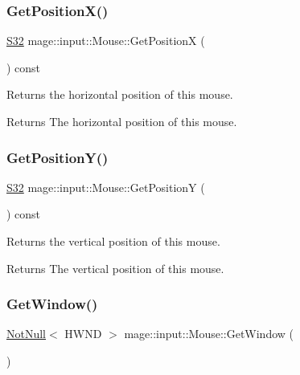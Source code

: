 \subsubsection{\texorpdfstring{Get\+Position\+X()}{GetPositionX()}}
{\footnotesize\ttfamily \mbox{\hyperlink{namespacemage_a2ef1a005a77358f1825d13fd481b557f}{S32}} mage\+::input\+::\+Mouse\+::\+Get\+PositionX (\begin{DoxyParamCaption}{ }\end{DoxyParamCaption}) const\hspace{0.3cm}{\ttfamily [noexcept]}}

Returns the horizontal position of this mouse.

\begin{DoxyReturn}{Returns}
The horizontal position of this mouse. 
\end{DoxyReturn}
\mbox{\label{classmage_1_1input_1_1_mouse_a81bf0ebd5fb34a25ba9f5d4c7aea1ed6}} 
\subsubsection{\texorpdfstring{Get\+Position\+Y()}{GetPositionY()}}
{\footnotesize\ttfamily \mbox{\hyperlink{namespacemage_a2ef1a005a77358f1825d13fd481b557f}{S32}} mage\+::input\+::\+Mouse\+::\+Get\+PositionY (\begin{DoxyParamCaption}{ }\end{DoxyParamCaption}) const\hspace{0.3cm}{\ttfamily [noexcept]}}

Returns the vertical position of this mouse.

\begin{DoxyReturn}{Returns}
The vertical position of this mouse. 
\end{DoxyReturn}
\mbox{\label{classmage_1_1input_1_1_mouse_a5fd893af2aede58106b718448e7e0dde}} 
\subsubsection{\texorpdfstring{Get\+Window()}{GetWindow()}}
{\footnotesize\ttfamily \mbox{\hyperlink{namespacemage_a8769f9d670d6b585ea306cb1062af94b}{Not\+Null}}$<$ H\+W\+ND $>$ mage\+::input\+::\+Mouse\+::\+Get\+Window (\begin{DoxyParamCaption}{ }\end{DoxyParamCaption})\hspace{0.3cm}{\ttfamily [noexcept]}}

